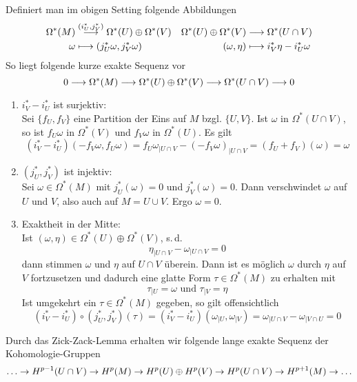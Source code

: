 \Prop{}
Definiert man im obigen Setting folgende Abbildungen
\begin{align*}
\Omega^*(M) & \overset{(i^*_U, j^*_V)}{\longrightarrow} \Omega^*(U) \oplus \Omega^*(V) & \Omega^*(U) \oplus \Omega^*(V) & \overset{}{\longrightarrow} \Omega^*(U\cap V)\\
\omega & \longmapsto (j^*_U \omega, j^*_V \omega) & (\omega, \eta) & \longmapsto i^*_V\eta - i^*_U\omega 
\end{align*}
So liegt folgende kurze exakte Sequenz vor
\[ 0 \overset{}{\longrightarrow} \Omega^*(M) \overset{}{\longrightarrow} \Omega^*(U) \oplus \Omega^*(V) \overset{}{\longrightarrow} \Omega^*(U\cap V) \overset{}{\longrightarrow} 0 \]
\newpage
\begin{Beweis}{}
\begin{enumerate}[1)]
	\item $i_V^*-i_U^*$ ist surjektiv:\\
	Sei $\{f_U,f_V\}$ eine Partition der Eins auf $M$ bzgl. $\{U,V\}$. Ist $\omega $ in $ \Omega^*(U\cap V)$, so ist $f_U\omega $ in $\Omega^*(V)$ und $f_V \omega$ in $\Omega^*(U)$. Es gilt
	\[ (i_V^* - i_U^*)(-f_V\omega, f_U \omega) = f_U\omega_{|U\cap V} - (-f_V \omega)_{|U\cap V} = (f_U + f_V)(\omega) = \omega \]
	\item $(j_U^*, j_V^*)$ ist injektiv:\\
	Sei $\omega \in \Omega^*(M)$ mit $j_U^*(\omega) = 0$ und $j_V^*(\omega) = 0$. Dann verschwindet $\omega$ auf $U$ und $V$, also auch auf $M = U\cup V$. Ergo $\omega = 0$.
	\item Exaktheit in der Mitte:\\
	Ist $(\omega, \eta) \in \Omega^*(U) \oplus \Omega^*(V)$, s.\,d.
	\[ \eta_{|U\cap V} - \omega_{|U\cap V} = 0 \]
	dann stimmen $\omega$ und $\eta$ auf $U\cap V$ überein. Dann ist es möglich $\omega$ durch $\eta$ auf $V$ fortzusetzen und dadurch eine glatte Form $\tau \in \Omega^*(M)$ zu erhalten mit
	\[ \tau_{|U}= \omega \text{ und } \tau_{|V} = \eta \]
	Ist umgekehrt ein $\tau \in \Omega^*(M)$ gegeben, so gilt offensichtlich
	\[ (i^*_V - i_U^*)\circ (j_U^*, j_V^*)(\tau) = (i^*_V - i_U^*) (\omega_{|U}, \omega_{|V}) = \omega_{|U\cap V} - \omega_{|V\cap U} = 0 \]
\end{enumerate}
\end{Beweis}
\Bem{}
Durch das Zick-Zack-Lemma erhalten wir folgende lange exakte Sequenz der Kohomologie-Gruppen
\[ \ldots \overset{}{\rightarrow} H^{p-1}(U\cap V) \overset{}{\rightarrow} H^p(M) \overset{}{\rightarrow} H^p(U) \oplus H^p(V) \overset{}{\rightarrow} H^p(U\cap V) \overset{}{\rightarrow} H^{p+1}(M) \overset{}{\rightarrow} \ldots \]
